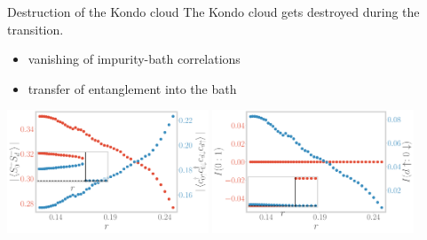 \documentclass[8pt,aspectratio=169]{beamer}
\newcommand{\nitem}{\item[\ding{51}]}
\begin{document}
\begin{frame}{Destruction of the Kondo cloud}
\centering
\alert{The Kondo cloud gets destroyed} during the transition.

\vspace*{\fill}

\begin{minipage}{0.4\textwidth}
\begin{itemize}
	\nitem vanishing of impurity-bath correlations
\end{itemize}
\end{minipage}
\hspace*{\fill}
\begin{minipage}{0.4\textwidth}
\begin{itemize}
	\nitem transfer of entanglement into the bath
\end{itemize}
\end{minipage}

\vspace*{\fill}

\includegraphics[width=0.45\textwidth]{pairing.pdf}
\hspace*{\fill}
\includegraphics[width=0.45\textwidth]{I_r.pdf}
\end{frame}
\end{document}
